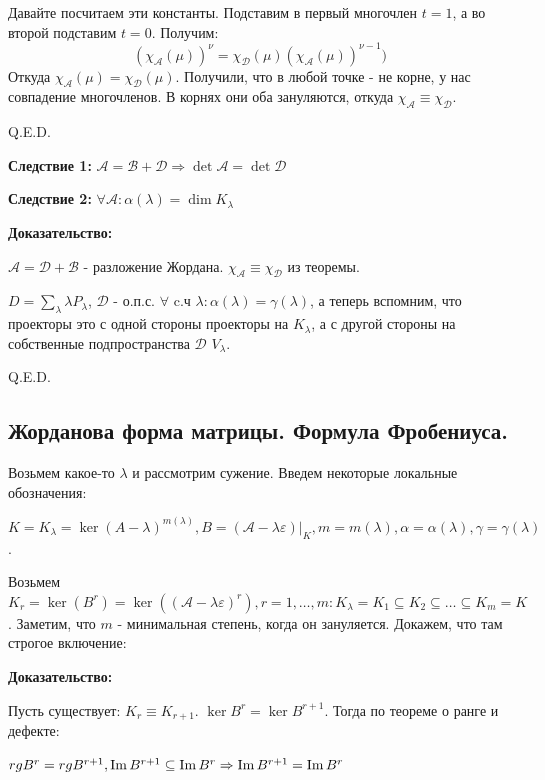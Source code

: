 Давайте посчитаем эти константы. Подставим в первый многочлен $t=1$, а во второй подставим $t=0$. Получим:
$$(\chi_{\mathcal{A}}(\mu))^{\nu} = \chi_{\mathcal{D}}(\mu) (\chi_{\mathcal{A}}(\mu))^{\nu-1})$$
Откуда $\chi_{\mathcal{A}}(\mu)=\chi_{\mathcal{D}}(\mu)$. Получили, что в любой точке - не корне, у нас совпадение многочленов. В корнях они оба зануляются, откуда $\chi_{\mathcal{A}} \equiv \chi_{\mathcal{D}}$.

\hfill Q.E.D.

\textbf{Следствие 1:} $\mathcal{A} = \mathcal{B} + \mathcal{D} \Rightarrow \det \mathcal{A} =\det \mathcal{D} $

\textbf{Следствие 2:} $\forall \mathcal{A} :\alpha(\lambda) = \dim K_{\lambda}$

\textbf{Доказательство:}

$\mathcal{A} = \mathcal{D} + \mathcal{B}$ - разложение Жордана. $\chi_{\mathcal{A}}\equiv \chi_{\mathcal{D}}$ из теоремы.

$D = \sum\limits_{\lambda}\lambda P_{\lambda}$, $\mathcal{D}$ - о.п.с. $\forall $ c.ч $\lambda: \alpha(\lambda) = \gamma(\lambda)$, а теперь вспомним, что проекторы это с одной стороны проекторы на $K_{\lambda}$, а с другой стороны на собственные подпространства $\mathcal{D}$ $V_{\lambda}$.

\hfill Q.E.D.

\pagebreak

\subsection{Жорданова форма матрицы. Формула Фробениуса. }

Возьмем какое-то $\lambda$ и рассмотрим сужение. Введем некоторые локальные обозначения:

$K=K_{\lambda} = \ker (A-\lambda)^{m(\lambda)},B = (\mathcal{A}-\lambda\varepsilon)\Big|_{K},m = m(\lambda),\alpha= \alpha(\lambda),\gamma=\gamma(\lambda)$.

Возьмем $K_r = \ker(B^r) = \ker((\mathcal{A}-\lambda\varepsilon)^r),r= 1,\ldots, m: K_\lambda = K_1 \subseteq K_2 \subseteq\ldots \subseteq K_m = K $. Заметим, что $m$ - минимальная степень, когда он зануляется. Докажем, что там строгое включение:

\textbf{Доказательство:}

Пусть существует: $K_r \equiv K_{r+1}$. $\ker B^r = \ker B^{r+1}$. Тогда по теореме о ранге и дефекте: 

$rg B^r = rg B^{r+1}, \operatorname{Im} B^{r+1} \subseteq \operatorname{Im} B^r\Rightarrow \operatorname{Im} B^{r+1} =\operatorname{Im} B^r $

